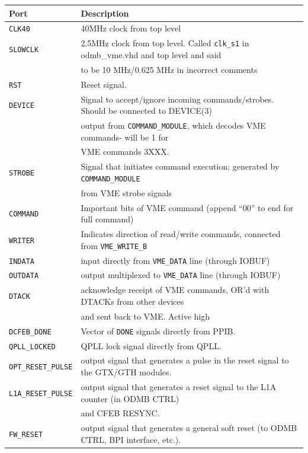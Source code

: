 \documentclass[10pt,a4paper]{article}
\begin{document}
\begin{table}[H]
\begin{tabular}{|l|l|} \hline
Port& Description\\ \hline
\texttt{CLK40}& 40MHz clock from top level\\ \hline
\texttt{SLOWCLK}& 2.5MHz clock from top level. Called \texttt{clk\_s1} in odmb\_vme.vhd and top level and said \\
       &to be 10 MHz/0.625 MHz in incorrect comments\\ \hline
\texttt{RST}& Reset signal.\\ \hline
\texttt{DEVICE}& Signal to accept/ignore incoming commands/strobes. Should be connected to DEVICE(3) \\
      & output from \texttt{COMMAND\_MODULE}, which decodes VME commands- will be 1 for \\
			& VME commands 3XXX.\\ \hline 
\texttt{STROBE}& Signal that initiates command execution; generated by \texttt{COMMAND\_MODULE} \\
      & from VME strobe signals\\ \hline
\texttt{COMMAND}& Important bits of VME command (append ``00'' to end for full command)\\ \hline
\texttt{WRITER}& Indicates direction of read/write commands, connected from \texttt{VME\_WRITE\_B}\\ \hline
\texttt{INDATA}& input directly from \texttt{VME\_DATA} line (through IOBUF)\\ \hline
\texttt{OUTDATA}& output multiplexed to \texttt{VME\_DATA} line (through IOBUF)\\ \hline
\texttt{DTACK}& acknowledge receipt of VME commands, OR'd with DTACKs from other devices \\
     & and sent back to VME. Active high\\ \hline
\texttt{DCFEB\_DONE}& Vector of \texttt{DONE} signals directly from PPIB.\\ \hline
\texttt{QPLL\_LOCKED}& QPLL lock signal directly from QPLL.\\ \hline
\texttt{OPT\_RESET\_PULSE}& output signal that generates a pulse in the reset signal to the GTX/GTH modules.\\ \hline
\texttt{L1A\_RESET\_PULSE}& output signal that generates a reset signal to the L1A counter (in ODMB CTRL)\\
                          &  and CFEB RESYNC.\\ \hline
\texttt{FW\_RESET}& output signal that generates a general soft reset (to ODMB CTRL, BPI interface, etc.).\\ \hline

\end{tabular}
\end{table}
\end{document}
